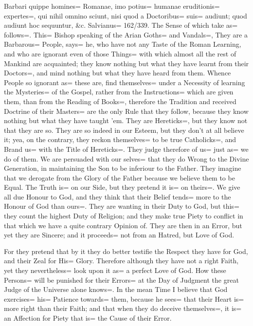 Barbari quippe homines= Romanae, imo potius= humanae eruditionis= expertes=, qui nihil omnino sciunt, nisi quod a Doctoribus= suis= audiunt;
quod audiunt hoc sequuntur, \&c.
Salvianus= 162/339.
The Sense of which take as= follows=.
This= Bishop speaking of the Arian Goths= and Vandals=, They are a Barbarous= People, says= he, who have not any Taste of the Roman Learning, and who are ignorant even of those Things= with which almost all the rest of Mankind are acquainted;
they know nothing but what they have learnt from their Doctors=, and mind nothing but what they have heard from them.
Whence People so ignorant as= these are, find themselves= under a Necessity of learning the Mysteries= of the Gospel, rather from the Instructions= which are given them, than from the Reading of Books=, therefore the Tradition and received Doctrine of their Masters= are the only Rule that they follow, because they know nothing but what they have taught 'em.
They are Hereticks=, but they know not that they are so.
They are so indeed in our Esteem, but they don't at all believe it;
yea, on the contrary, they reckon themselves= to be true Catholicks=, and Brand us= with the Title of Hereticks=.
They judge therefore of us= just as= we do of them.
We are persuaded with our selves= that they do Wrong to the Divine Generation, in maintaining the Son to be inferiour to the Father.
They imagine that we derogate from the Glory of the Father because we believe them to be Equal.
The Truth is= on our Side, but they pretend it is= on theirs=.
We give all due Honour to God, and they think that their Belief tends= more to the Honour of God than ours=.
They are wanting in their Duty to God, but this= they count the highest Duty of Religion;
and they make true Piety to conflict in that which we have a quite contrary Opinion of.
They are then in an Error, but yet they are Sincere;
and it proceeds= not from an Hatred, but Love of God.

For they pretend that by it they do better testifie the Respect they have for God, and their Zeal for His= Glory.
Therefore although they have not a right Faith, yet they nevertheless= look upon it as= a perfect Love of God.
How these Persons= will be punished for their Errors= at the Day of Judgment the great Judge of the Universe alone knows=.
In the mean Time I believe that God exercises= his= Patience towards= them, because he sees= that their Heart is= more right than their Faith;
and that when they do deceive themselves=, it is= an Affection for Piety that is= the Cause of their Error.

